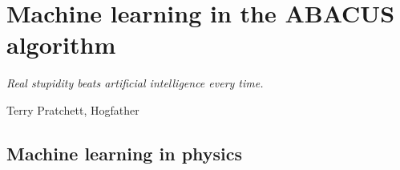 \documentclass[11pt, a4paper]{report} %
\begin{document}
\begin{table}
\centering
{}
\caption{Number of states required for a given sum rule saturation in the XXZ model.
In parentheses are the fraction Hilbert space fraction this represents, with the second number in
parentheses the number of contributions needed if the algorithm was perfectly able to only sum monotonically decreasing form factors.
Table reproduced from~\cite{Caux2009}.
}
\label{table:saturation}
\end{table}



\chapter{Machine learning in the ABACUS algorithm}\label{chap:machine_learning}

\epigraph{\textit{Real stupidity beats artificial intelligence every time.}}{Terry Pratchett, Hogfather}

\section{Machine learning in physics}
\end{document}
